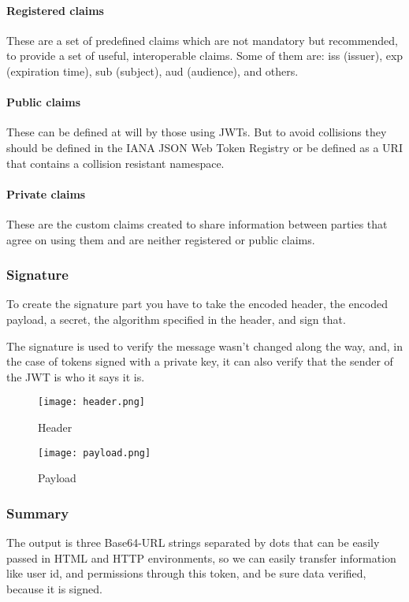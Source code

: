 		\paragraph{Registered claims}
		These are a set of predefined claims which are not mandatory but recommended, to provide a set of useful, interoperable claims. Some of them are: iss (issuer), exp (expiration time), sub (subject), aud (audience), and others.
		\paragraph{Public claims}
		These can be defined at will by those using JWTs. But to avoid collisions they should be defined in the IANA JSON Web Token Registry or be defined as a URI that contains a collision resistant namespace.
		\paragraph{Private claims}
		These are the custom claims created to share information between parties that agree on using them and are neither registered or public claims.
		
		
	\subsubsection{Signature}
	To create the signature part you have to take the encoded header, the encoded payload, a secret, the algorithm specified in the header, and sign that.
	
	The signature is used to verify the message wasn't changed along the way, and, in the case of tokens signed with a private key, it can also verify that the sender of the JWT is who it says it is.
	
	
		\begin{figure}[h!]
    		\centering
    		\texttt{[image: header.png]}
    		\caption{Header}
    		\label{fig:header}
		\end{figure}
	
		\begin{figure}[h!]
    		\centering
    		\texttt{[image: payload.png]}
    		\caption{Payload}
    		\label{fig:payload}
		\end{figure}
		
		
	\subsubsection{Summary}
	The output is three Base64-URL strings separated by dots that can be easily passed in HTML and HTTP environments, so we can easily transfer information like user id, and permissions through this token, and be sure data verified, because it is signed.
	
